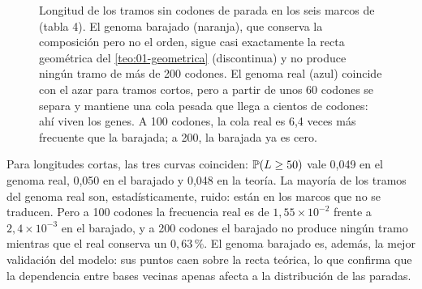 \begin{figure}[t]
\centering
{}
\caption[Supervivencia de los ORFs de \emph{M.\,genitalium}]{Longitud de los tramos sin codones de parada en los seis marcos de  (tabla 4). El genoma barajado (naranja), que conserva la composición pero no el orden, sigue casi exactamente la recta geométrica del \cref{teo:01-geometrica} (discontinua) y no produce ningún tramo de más de 200 codones. El genoma real (azul) coincide con el azar para tramos cortos, pero a partir de unos 60 codones se separa y mantiene una cola pesada que llega a cientos de codones: ahí viven los genes. A 100 codones, la cola real es 6,4 veces más frecuente que la barajada; a 200, la barajada ya es cero.}
\label{fig:01-supervivencia}
\end{figure}

Para longitudes cortas, las tres curvas coinciden: $\mathbb{P}(L\ge50)$ vale 0,049 en el genoma real, 0,050 en el barajado y 0,048 en la teoría. La mayoría de los tramos del genoma real son, estadísticamente, ruido: están en los marcos que no se traducen. Pero a 100 codones la frecuencia real es de $1{,}55\times10^{-2}$ frente a $2{,}4\times10^{-3}$ en el barajado, y a 200 codones el barajado no produce ningún tramo mientras que el real conserva un $0{,}63\,\%$. El genoma barajado es, además, la mejor validación del modelo: sus puntos caen sobre la recta teórica, lo que confirma que la dependencia entre bases vecinas apenas afecta a la distribución de las paradas.

